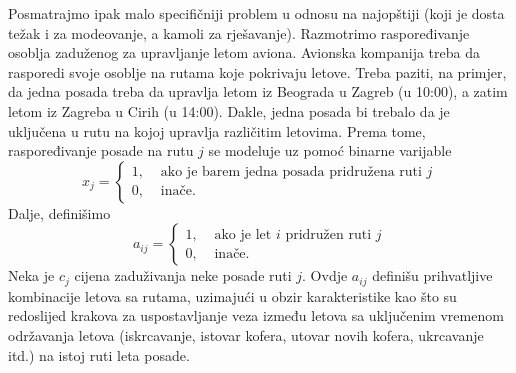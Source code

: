 \documentclass[a4paper, utf8, 11pt, colorlinks]{book}
\theoremstyle{definition}
\begin{document}
Posmatrajmo ipak malo specifičniji problem u odnosu na najopštiji (koji je dosta težak i za modeovanje, a kamoli za rješavanje). 
Razmotrimo raspoređivanje osoblja zaduženog za upravljanje letom aviona. 
Avionska kompanija treba da rasporedi svoje osoblje na rutama koje pokrivaju letove. Treba paziti, na primjer, da jedna posada treba da upravlja letom iz  Beograda u Zagreb (u 10:00), a zatim letom iz Zagreba u Cirih (u 14:00). Dakle, jedna posada bi trebalo da je uključena u rutu na kojoj upravlja različitim letovima. Prema tome, raspoređivanje posade na rutu $j$ se modeluje uz pomoć binarne varijable 
$$x_j = \begin{cases}
    1,& \mbox{ ako je barem jedna posada pridružena ruti } j \\
    0,& \mbox{ inače}. 
\end{cases}
$$
Dalje, definišimo 
$$a_{ij}= \begin{cases}
             1,& \mbox{ ako je let } i \mbox{ pridružen ruti } j \\
             0,& \mbox{ inače}.
        \end{cases}
$$
Neka je $c_j$ cijena zaduživanja neke posade ruti $j$. Ovdje $a_{ij}$ definišu prihvatljive kombinacije letova sa rutama, uzimajući u obzir  karakteristike kao što su redoslijed krakova za uspostavljanje veza između letova sa uključenim vremenom  održavanja letova (iskrcavanje, istovar  kofera, utovar   novih kofera, ukrcavanje itd.) na istoj ruti leta posade.   
\end{document}
